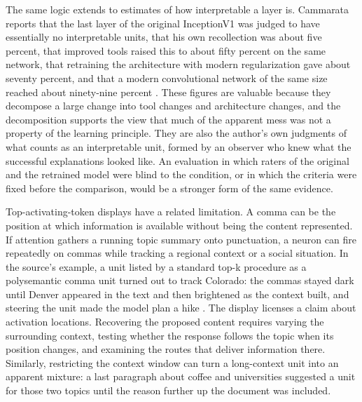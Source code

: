 \documentclass[11pt]{article}
\begin{document}
The same logic extends to estimates of how interpretable a layer is. Cammarata reports that the last layer of the original InceptionV1 was judged to have essentially no interpretable units, that his own recollection was about five percent, that improved tools raised this to about fifty percent on the same network, that retraining the architecture with modern regularization gave about seventy percent, and that a modern convolutional network of the same size reached about ninety-nine percent \cite[\emph{A History of Microscope Errors}]{cammarata}. These figures are valuable because they decompose a large change into tool changes and architecture changes, and the decomposition supports the view that much of the apparent mess was not a property of the learning principle. They are also the author's own judgments of what counts as an interpretable unit, formed by an observer who knew what the successful explanations looked like. An evaluation in which raters of the original and the retrained model were blind to the condition, or in which the criteria were fixed before the comparison, would be a stronger form of the same evidence.

Top-activating-token displays have a related limitation. A comma can be the position at which information is available without being the content represented. If attention gathers a running topic summary onto punctuation, a neuron can fire repeatedly on commas while tracking a regional context or a social situation. In the source's example, a unit listed by a standard top-k procedure as a polysemantic comma unit turned out to track Colorado: the commas stayed dark until Denver appeared in the text and then brightened as the context built, and steering the unit made the model plan a hike \cite[\emph{Superposition of the Gaps}]{cammarata}. The display licenses a claim about activation locations. Recovering the proposed content requires varying the surrounding context, testing whether the response follows the topic when its position changes, and examining the routes that deliver information there. Similarly, restricting the context window can turn a long-context unit into an apparent mixture: a last paragraph about coffee and universities suggested a unit for those two topics until the reason further up the document was included.
\end{document}
